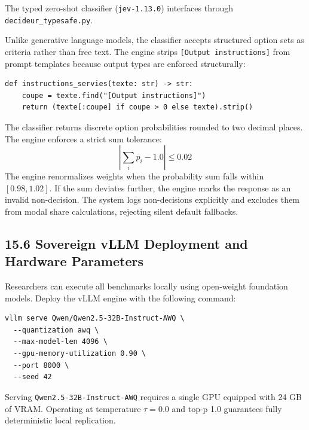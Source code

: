 The typed zero-shot classifier (\texttt{jev-1.13.0}) interfaces through \texttt{decideur\_typesafe.py}.

Unlike generative language models, the classifier accepts structured option sets as criteria rather than free text. The engine strips \texttt{[Output instructions]} from prompt templates because output types are enforced structurally:

\begin{Verbatim}
def instructions_servies(texte: str) -> str:
    coupe = texte.find("[Output instructions]")
    return (texte[:coupe] if coupe > 0 else texte).strip()
\end{Verbatim}

The classifier returns discrete option probabilities rounded to two decimal places. The engine enforces a strict sum tolerance:
\[\left|\sum_{i} p_i - 1.0\right| \le 0.02\]
The engine renormalizes weights when the probability sum falls within $[0.98, 1.02]$. If the sum deviates further, the engine marks the response as an invalid non-decision. The system logs non-decisions explicitly and excludes them from modal share calculations, rejecting silent default fallbacks.

\subsection{15.6 Sovereign vLLM Deployment and Hardware Parameters}

Researchers can execute all benchmarks locally using open-weight foundation models. Deploy the vLLM engine with the following command:

\begin{Verbatim}
vllm serve Qwen/Qwen2.5-32B-Instruct-AWQ \
  --quantization awq \
  --max-model-len 4096 \
  --gpu-memory-utilization 0.90 \
  --port 8000 \
  --seed 42
\end{Verbatim}

Serving \texttt{Qwen2.5-32B-Instruct-AWQ} requires a single GPU equipped with 24 GB of VRAM. Operating at temperature $\tau = 0.0$ and top-p 1.0 guarantees fully deterministic local replication.
